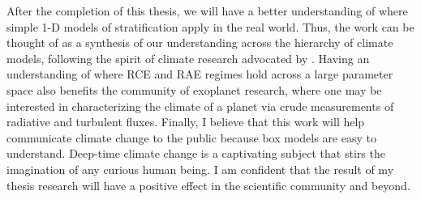 \documentclass{article}
\begin{document}
After the completion of this thesis, we will have a better understanding of where simple 1-D models of stratification apply in the real world. Thus, the work can be thought of as a synthesis of our understanding across the hierarchy of climate models, following the spirit of climate research advocated by \citet{held-2005}. Having an understanding of where RCE and RAE regimes hold across a large parameter space also benefits the community of exoplanet research, where one may be interested in characterizing the climate of a planet via crude measurements of radiative and turbulent fluxes. Finally, I believe that this work will help communicate climate change to the public because box models are easy to understand. Deep-time climate change is a captivating subject that stirs the imagination of any curious human being. I am confident that the result of my thesis research will have a positive effect in the scientific community and beyond. 

\clearpage

\end{document}
